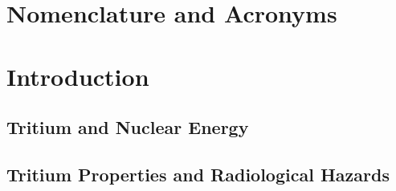 \documentclass[12pt,a4paper]{book}
\begin{document}
\newpage

\chapter*{Nomenclature and Acronyms} \label{chap:NomenclatureAcronyms}  %
{} %




\tableofcontents

\listoffigures

{} %

\listoftables

{} %




\chapter{Introduction}  \label{chap:GeneralIntroduction}  %
	\section{Tritium and Nuclear Energy}\label{sec:Introduction}
	 
	
	\section{Tritium Properties and Radiological Hazards}\label{sec:TritiumProperties}
	
	
\end{document}
